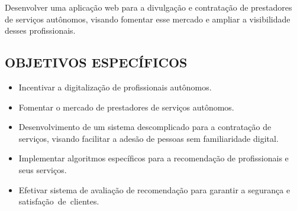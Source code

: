 Desenvolver uma aplicação web para a divulgação e contratação de prestadores de serviços autônomos, visando fomentar esse mercado e ampliar a visibilidade desses profissionais. 

\subsection*{OBJETIVOS ESPECÍFICOS}
\begin{itemize}
    \item Incentivar a digitalização de profissionais autônomos. 
    
    \item Fomentar o mercado de prestadores de serviços autônomos. 
    
    \item Desenvolvimento de um sistema descomplicado para a contratação de serviços, visando facilitar a adesão de pessoas sem familiaridade digital. 

    \item Implementar algoritmos específicos para a recomendação de profissionais e seus serviços. 

    \item Efetivar sistema de avaliação de recomendação para garantir a segurança e satisfação de clientes.
\end{itemize}
